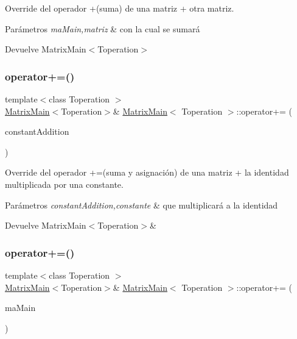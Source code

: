 Override del operador +(suma) de una matriz + otra matriz. 


\begin{DoxyParams}{Parámetros}
{\em ma\+Main,matriz} & con la cual se sumará \\
\hline
\end{DoxyParams}
\begin{DoxyReturn}{Devuelve}
Matrix\+Main$<$\+Toperation$>$ 
\end{DoxyReturn}
\mbox{\label{classMatrixMain_a9c4235d9cb94762af7d7fcf9d3185ae5}} 
\subsubsection{\texorpdfstring{operator+=()}{operator+=()}\hspace{0.1cm}{\footnotesize\ttfamily [1/2]}}
{\footnotesize\ttfamily template$<$class Toperation $>$ \\
\hyperlink{classMatrixMain}{Matrix\+Main}$<$Toperation$>$\& \hyperlink{classMatrixMain}{Matrix\+Main}$<$ Toperation $>$\+::operator+= (\begin{DoxyParamCaption}\item[{const Toperation \&}]{constant\+Addition }\end{DoxyParamCaption})}



Override del operador +=(suma y asignación) de una matriz + la identidad multiplicada por una constante. 


\begin{DoxyParams}{Parámetros}
{\em constant\+Addition,constante} & que multiplicará a la identidad \\
\hline
\end{DoxyParams}
\begin{DoxyReturn}{Devuelve}
Matrix\+Main$<$\+Toperation$>$\& 
\end{DoxyReturn}
\mbox{\label{classMatrixMain_ac4f89e678cec819cbeffdf363a4bf717}} 
\subsubsection{\texorpdfstring{operator+=()}{operator+=()}\hspace{0.1cm}{\footnotesize\ttfamily [2/2]}}
{\footnotesize\ttfamily template$<$class Toperation $>$ \\
\hyperlink{classMatrixMain}{Matrix\+Main}$<$Toperation$>$\& \hyperlink{classMatrixMain}{Matrix\+Main}$<$ Toperation $>$\+::operator+= (\begin{DoxyParamCaption}\item[{\hyperlink{classMatrixMain}{Matrix\+Main}$<$ Toperation $>$ \&}]{ma\+Main }\end{DoxyParamCaption})}



